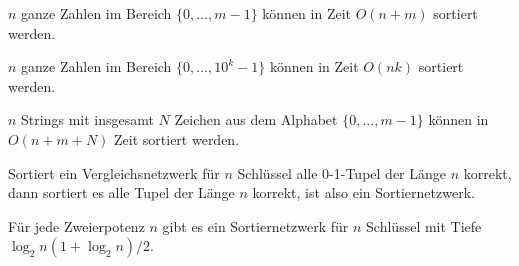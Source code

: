 \documentclass{cheat-sheet}
\begin{document}

\fbox{
  \begin{minipage}{8.5cm}
    \hfill\vspace{2.5cm}
  \end{minipage}
}

\begin{satz}
  $n$ ganze Zahlen im Bereich $\{ 0, ..., m-1 \}$ können in Zeit $O(n+m)$ sortiert werden.
\end{satz}

\begin{satz}
  $n$ ganze Zahlen im Bereich $\{ 0, ..., 10^k-1 \}$ können in Zeit $O(nk)$ sortiert werden.
\end{satz}


\begin{satz}
  $n$ Strings mit insgesamt $N$ Zeichen aus dem Alphabet $\{ 0, ..., m-1 \}$ können in $O(n + m + N)$ Zeit sortiert werden.
\end{satz}


\begin{satz}[0-1-Prinzip]
  Sortiert ein Vergleichsnetzwerk für $n$ Schlüssel alle 0-1-Tupel der Länge $n$ korrekt, dann sortiert es alle Tupel der Länge $n$ korrekt, ist also ein Sortiernetzwerk.
\end{satz}

\begin{satz}
  Für jede Zweierpotenz $n$ gibt es ein Sortiernetzwerk für $n$ Schlüssel mit Tiefe $\log_2 n (1 + \log_2 n) / 2$.
\end{satz}







\end{document}
